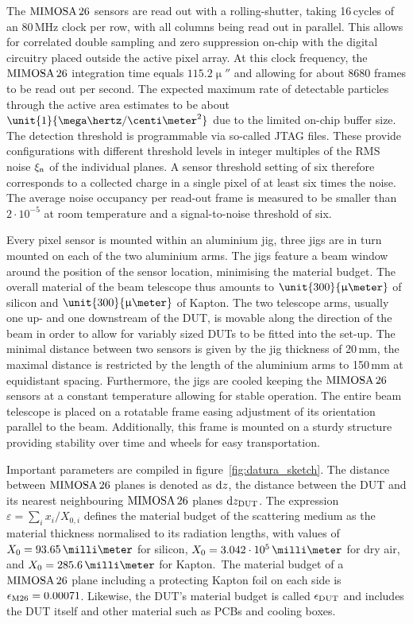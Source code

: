 The $\textrm{MIMOSA\,26}$ sensors are read out with a rolling-shutter, taking 16\,cycles of an 80\,MHz clock per row, with all columns being read out in parallel. 
This allows for correlated double sampling and zero suppression on-chip with the digital circuitry placed outside the active pixel array. 
At this clock frequency, the $\textrm{MIMOSA\,26}$ integration time equals $\unit{115.2}{\upmu\second}$ and allowing for about 8680 frames to be read out per second. 
The expected maximum rate of detectable particles through the active area estimates to be about $\unit{1}{\mega\hertz/\centi\meter^2}$ due to the limited on-chip buffer size. 
The detection threshold is programmable via so-called JTAG files. 
These provide configurations with different threshold levels in integer multiples of the RMS noise $\xi_{\textrm{n}}$ of the individual planes. 
A sensor threshold setting of six therefore corresponds to a collected charge in a single pixel of at least six times the noise. 
The average noise occupancy per read-out frame is measured to be smaller than $2\cdot10^{-5}$ at room temperature and a signal-to-noise threshold of six.

Every pixel sensor is mounted within an aluminium jig, three jigs are in turn mounted on each of the two aluminium arms. 
The jigs feature a beam window around the position of the sensor location, minimising the material budget. 
The overall material of the beam telescope thus amounts to $\unit{300}{\upmu\meter}$ of silicon and $\unit{300}{\upmu\meter}$ of Kapton. 
The two telescope arms, usually one up- and one downstream of the DUT, is movable along the direction of the beam in order to allow for variably sized DUTs to be fitted into the set-up. 
The minimal distance between two sensors is given by the jig thickness of 20\,mm, the maximal distance is restricted by the length of the aluminium arms to 150\,mm at equidistant spacing.
Furthermore, the jigs are cooled keeping the $\textrm{MIMOSA\,26}$ sensors at a constant temperature allowing for stable operation.
The entire beam telescope is placed on a rotatable frame easing adjustment of its orientation parallel to the beam. 
Additionally, this frame is mounted on a sturdy structure providing stability over time and wheels for easy transportation. 

Important parameters are compiled in figure~\ref{fig:datura_sketch}. 
The distance between $\textrm{MIMOSA\,26}$ planes is denoted as $\textrm{d}z$, the distance between the DUT and its nearest neighbouring $\textrm{MIMOSA\,26}$ planes $\textrm{d}z_{\textrm{DUT}}$. 
The expression $\varepsilon = \sum_i x_{i}/X_{0,i}$ defines the material budget of the scattering medium as the material thickness normalised to its radiation lengths,
 with values of $X_0 = 93.65\,\milli\meter$ for silicon, $X_0 = 3.042\cdot 10^{5}\,\milli\meter$ for dry air, and $X_0 = 285.6\,\milli\meter$ for Kapton.\,\cite{ref:x0values}
The material budget of a $\textrm{MIMOSA\,26}$ plane including a protecting Kapton foil on each side is $\mathnormal{\epsilon_{\textrm{M26}}} = 0.00071$. 
Likewise, the DUT's material budget is called $\mathnormal{\epsilon_{\textrm{DUT}}}$ and includes the DUT itself and other material such as PCBs and cooling boxes.


